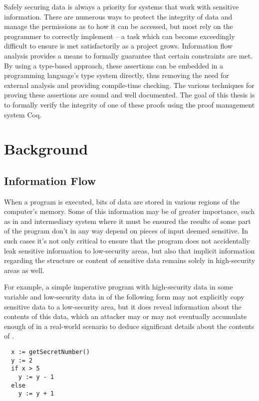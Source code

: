 \documentclass[12pt]{report}
\begin{document}
 Safely securing data is always a priority for systems that work
with sensitive information. There are numerous ways to protect the
integrity of data and manage the permissions as to how it can be
accessed, but most rely on the programmer to correctly implement
– a task which can become exceedingly difficult to ensure is met
satisfactorily as a project grows. Information flow analysis provides
a means to formally guarantee that certain constraints are met. By
using a type-based approach, these assertions can be embedded in
a programming language's type system directly, thus removing the need
for external analysis and providing compile-time checking. The
various techniques for proving these assertions are sound and well
documented. The goal of this thesis is to formally verify the
integrity of one of these proofs using the proof management system
Coq. 

\section{Background}



\subsection{Information Flow}



 When a program is executed, bits of data are stored in various
 regions of the computer's memory. Some of this information may be of
 greater importance, such as in and intermediary system where it must
 be ensured the results of some part of the program don't in any way
 depend on pieces of input deemed sensitive. In such cases it's not
 only critical to ensure that the program does not accidentally leak
 sensitive information to low-security areas, but also that implicit
 information regarding the structure or content of sensitive data
 remains solely in high-security areas as well.


For example, a simple imperative program with high-security data in
some variable  and low-security data in  of
the following form may not explicitly copy sensitive data to
a low-security area, but it does reveal information about the
contents of this data, which an attacker may or may not eventually
accumulate enough of in a real-world scenario to deduce significant
details about the contents of .


\begin{verbatim}
  x := getSecretNumber()
  y := 2
  if x > 5
    y := y - 1
  else
    y := y + 1
\end{verbatim}
\end{document}
